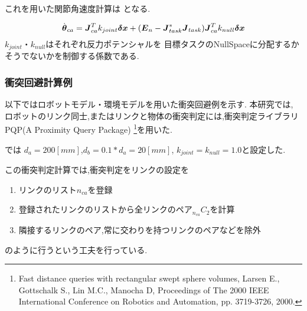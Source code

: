 これを用いた関節角速度計算は
となる.

\begin{equation}
\labeq{collision-avoidance-joint-speed}
\dot{\bm{\theta}}_{ca} = \bm{J}_{ca}^{T} k_{joint} \bm{\delta x}
+ (\bm{E}_n - \bm{J}_{task}^{*}\bm{J}_{task}) \bm{J}_{ca}^{T} k_{null} \bm{\delta x}
\end{equation}
$k_{joint}$・$k_{null}$はそれぞれ反力ポテンシャルを
目標タスクのNullSpaceに分配するかそうでないかを制御する係数である.


\subsubsection{衝突回避計算例}
以下ではロボットモデル・環境モデルを用いた衝突回避例を示す.
本研究では,
ロボットのリンク同士,またはリンクと物体の衝突判定には,衝突判定ライブラリ
PQP(A Proximity Query Package)
\footnote{
Fast distance queries with rectangular swept sphere volumes,
Larsen E., Gottschalk S., Lin M.C., Manocha D, 
Proceedings of The 2000 IEEE International Conference on Robotics and Automation, pp. 3719-3726, 2000.
}を用いた.

では
$d_a = 200[mm]$,$d_b = 0.1 * d_a = 20[mm]$,
$k_{joint} = k_{null} = 1.0$と設定した.

この衝突判定計算では,衝突判定をリンクの設定を
\begin{enumerate}
\item リンクのリスト$n_{ca}$を登録
\item 登録されたリンクのリストから全リンクのペア$_{n_{ca}}C_2$を計算
\item 隣接するリンクのペア,常に交わりを持つリンクのペアなどを除外
\end{enumerate}
のように行うという工夫を行っている.



